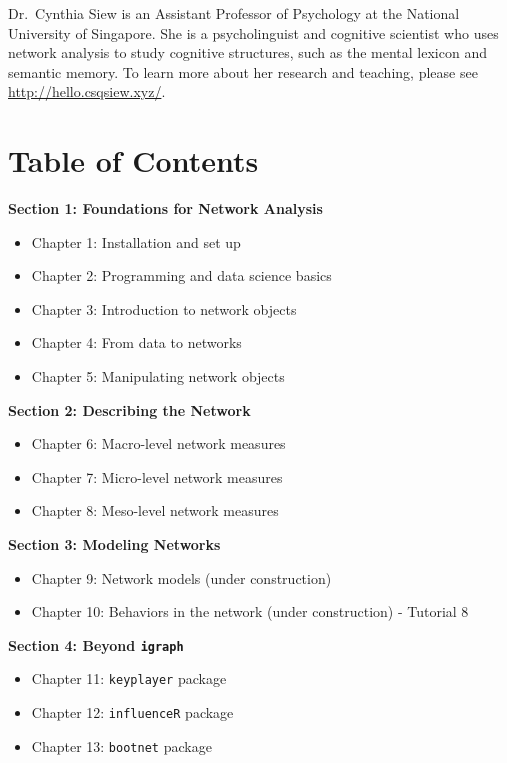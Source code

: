 \documentclass[
]{book}
\providecommand{\tightlist}{%
  \setlength{\itemsep}{0pt}\setlength{\parskip}{0pt}}
\begin{document}
Dr.~Cynthia Siew is an Assistant Professor of Psychology at the National University of Singapore. She is a psycholinguist and cognitive scientist who uses network analysis to study cognitive structures, such as the mental lexicon and semantic memory. To learn more about her research and teaching, please see \url{http://hello.csqsiew.xyz/}.

\section{Table of Contents}\label{table-of-contents}

\textbf{Section 1: Foundations for Network Analysis}

\begin{itemize}
\tightlist
\item
  Chapter 1: Installation and set up
\item
  Chapter 2: Programming and data science basics
\item
  Chapter 3: Introduction to network objects
\item
  Chapter 4: From data to networks
\item
  Chapter 5: Manipulating network objects
\end{itemize}

\textbf{Section 2: Describing the Network}

\begin{itemize}
\tightlist
\item
  Chapter 6: Macro-level network measures
\item
  Chapter 7: Micro-level network measures
\item
  Chapter 8: Meso-level network measures
\end{itemize}

\textbf{Section 3: Modeling Networks}

\begin{itemize}
\tightlist
\item
  Chapter 9: Network models (under construction)
\item
  Chapter 10: Behaviors in the network (under construction) - Tutorial 8
\end{itemize}

\textbf{Section 4: Beyond \texttt{igraph}}

\begin{itemize}
\tightlist
\item
  Chapter 11: \texttt{keyplayer} package
\item
  Chapter 12: \texttt{influenceR} package
\item
  Chapter 13: \texttt{bootnet} package
\end{itemize}
\end{document}
